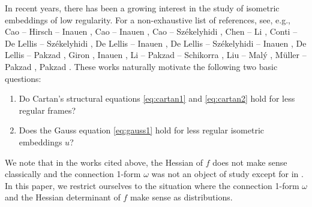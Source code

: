 \documentclass[12pt]{article}
\theoremstyle{plain}
\numberwithin{equation}{section}
\begin{document}
In recent years, there has been a growing interest in the study of isometric embeddings of low regularity. For a non-exhaustive list of references, see, e.g.,  Cao -- Hirsch -- Inauen \cite{cao_hirsch_inauen_Darboux_25}, Cao -- Inauen \cite{cao_inauen_2024}, Cao -- Székelyhidi \cite{cao_sz_isoExt_19, cao_sz_2022, cao_szekelyhidi_25}, Chen -- Li \cite{chen_li_18, chen_li_2021}, Conti -- De Lellis -- Székelyhidi \cite{conti_deLellis_szekelyhidi_12}, De Lellis -- Inauen \cite{deLellis_inauen_20}, De Lellis -- Székelyhidi -- Inauen \cite{dl_sz_in_2018}, De Lellis -- Pakzad \cite{deLellis_pakzad_21}, Giron \cite{giron_21}, Inauen \cite{inauen_19}, Li -- Pakzad -- Schikorra \cite{li_pakzad_schikorra_21}, Liu -- Mal\'{y} \cite{liu_maly}, Müller -- Pakzad \cite{muller_pakzad_05}, Pakzad \cite{pakzad_04, pakzad_24}. These works naturally motivate the following two basic questions:
\begin{enumerate}
    \item Do Cartan's structural equations \eqref{eq:cartan1} and \eqref{eq:cartan2} hold for less regular frames?
    \item Does the Gauss equation \eqref{eq:gauss1} hold for less regular isometric embeddings $u$?
\end{enumerate}
We note that in the works cited above, the Hessian of $f$ does not make sense classically and the connection 1-form $\omega$ was not an object of study except for in \cite{giron_21}. In this paper, we restrict ourselves to the situation where the connection 1-form $\omega$ and the Hessian determinant of $f$ make sense as distributions. 
\end{document}
